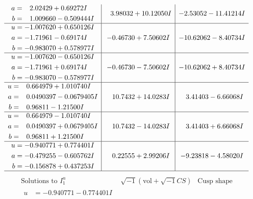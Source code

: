 \documentclass[1p]{elsarticle_modified}
\theoremstyle{definition}
\newcommand{\I}{\sqrt{-1}}
\begin{document}
$$\begin{array}{c|c|c}
\begin{aligned}
a &= \phantom{-}2.02429 + 0.69272 I \\
b &= \phantom{-}1.009660 - 0.509444 I\end{aligned}
 & \phantom{-}3.98032 + 10.12050 I & -2.53052 - 11.41214 I \\ \hline\begin{aligned}
u &= -1.007620 + 0.650126 I \\
a &= -1.71961 - 0.69174 I \\
b &= -0.983070 + 0.578977 I\end{aligned}
 & -0.46730 + 7.50602 I & -10.62062 - 8.40734 I \\ \hline\begin{aligned}
u &= -1.007620 - 0.650126 I \\
a &= -1.71961 + 0.69174 I \\
b &= -0.983070 - 0.578977 I\end{aligned}
 & -0.46730 - 7.50602 I & -10.62062 + 8.40734 I \\ \hline\begin{aligned}
u &= \phantom{-}0.664979 + 1.010740 I \\
a &= \phantom{-}0.0490397 - 0.0679405 I \\
b &= \phantom{-}0.96811 - 1.21500 I\end{aligned}
 & \phantom{-}10.7432 + 14.0283 I & \phantom{-}3.41403 - 6.66068 I \\ \hline\begin{aligned}
u &= \phantom{-}0.664979 - 1.010740 I \\
a &= \phantom{-}0.0490397 + 0.0679405 I \\
b &= \phantom{-}0.96811 + 1.21500 I\end{aligned}
 & \phantom{-}10.7432 - 14.0283 I & \phantom{-}3.41403 + 6.66068 I \\ \hline\begin{aligned}
u &= -0.940771 + 0.774401 I \\
a &= -0.479255 - 0.605762 I \\
b &= -0.156878 + 0.437253 I\end{aligned}
 & \phantom{-}0.22555 + 2.99206 I & -9.23818 - 4.58020 I\\
 \hline 
 \end{array}$$\newpage$$\begin{array}{c|c|c}  
\text{Solutions to }I^u_{1}& \I (\text{vol} + \sqrt{-1}CS) & \text{Cusp shape}\\
 \hline 
\begin{aligned}
u &= -0.940771 - 0.774401 I \\

\end{aligned}
\end{array}$$
\end{document}
